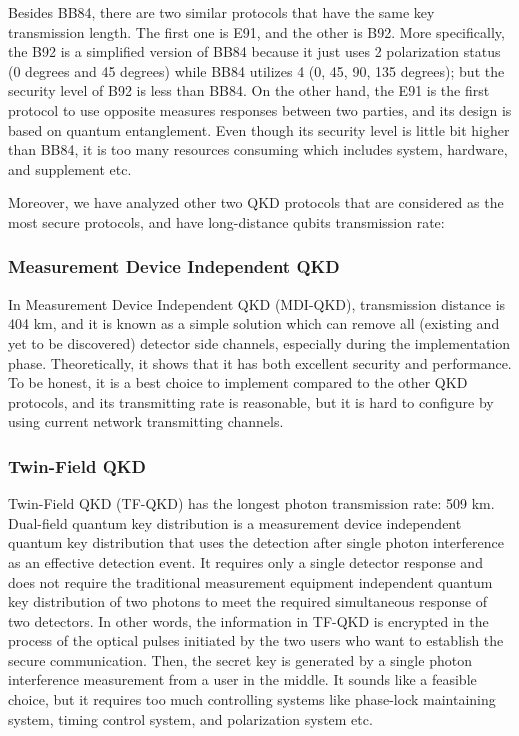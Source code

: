 \documentclass[sigconf]{acmart}
\begin{document}
Besides BB84, there are two similar protocols that have the same key transmission length. The first one is E91, and the other is B92. More specifically, the B92 is a simplified version of BB84 because it just uses 2 polarization status (0 degrees and 45 degrees) while BB84 utilizes 4 (0, 45, 90, 135 degrees); but the security level of B92 is less than BB84. On the other hand, the E91 is the first protocol to use opposite measures responses between two parties, and its design is based on quantum entanglement. Even though its security level is little bit higher than BB84, it is too many resources consuming which includes system, hardware, and supplement etc.

Moreover, we have analyzed other two QKD protocols that are considered as the most secure protocols, and have long-distance qubits transmission rate:

\subsubsection{Measurement Device Independent QKD}
In Measurement Device Independent QKD (MDI-QKD), transmission distance is 404 km, and it is known as a simple solution which can remove all (existing and yet to be discovered) detector side channels, especially during the implementation phase. Theoretically, it shows that it has both excellent security and performance. To be honest, it is a best choice to implement compared to the other QKD protocols, and its transmitting rate is reasonable, but it is hard to configure by using current network transmitting channels.

\subsubsection{Twin-Field QKD} 
Twin-Field QKD (TF-QKD) has the longest photon transmission rate: 509 km. Dual-field quantum key distribution is a measurement device independent quantum key distribution that uses the detection after single photon interference as an effective detection event. It requires only a single detector response and does not require the traditional measurement equipment independent quantum key distribution of two photons to meet the required simultaneous response of two detectors. In other words, the information in TF-QKD is encrypted in the process of the optical pulses initiated by the two users who want to establish the secure communication. Then, the secret key is generated by a single photon interference measurement from a user in the middle. It sounds like a feasible choice, but it requires too much controlling systems like phase-lock maintaining system, timing control system, and polarization system etc.
\end{document}
